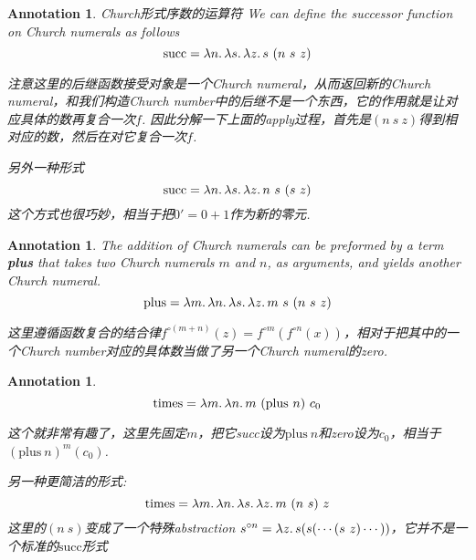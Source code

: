 \documentclass{article}
\theoremstyle{plain}
\newtheorem{annotation}[theorem]{Annotation}
\theoremstyle{nonumberplain}
\newcommand{\lam}[2]{\ensuremath{\lambda #1\ldotp #2}} %
\begin{document}
\begin{annotation}
\rm {\color{red}Church形式序数的运算符} We can define the successor function on Church numerals as follows
$$
\text{succ} = \lam{n}{\lam{s}{\lam{z}{s~(n~s~z)}}}
$$

{\color{blue} 注意这里的后继函数接受对象是一个Church numeral，从而返回新的Church numeral，和我们构造Church number中的后继不是一个东西，它的作用就是让对应具体的数再复合一次$f$. 因此分解一下上面的apply过程，首先是$(n~s~z)$得到相对应的数，然后在对它复合一次$f$}.

另外一种形式
$$
\text{succ} = \lam{n}{\lam{s}{\lam{z}{n~s~(s~z)}}}
$$
{\color{blue} 这个方式也很巧妙，相当于把$0' = 0 + 1$作为新的零元}.
\end{annotation}

\begin{annotation}
\rm The addition of Church numerals can be preformed by a term \textbf{plus} that takes two Church numerals $m$ and $n$, as arguments, and yields another Church numeral. 
$$
\text{plus} = \lam{m}{\lam{n}{\lam{s}{\lam{z}{m~s~(n~s~z)}}}}
$$

{\color{blue} 这里遵循函数复合的结合律$f^{\circ(m+n)}(z) = f^{\circ m}(f^{\circ n}(x))$，相对于把其中的一个Church number对应的具体数当做了另一个Church numeral的zero}.
\end{annotation} 

\begin{annotation} \rm
$$
\text{times} = \lam{m}{\lam{n}{m~(\text{plus}~n)~c_0}}
$$

{\color{blue} 这个就非常有趣了，这里先固定$m$，把它succ设为$\text{plus}~n$和zero设为$c_0$，相当于$(\text{plus}~n)^m(c_0)$}.

另一种更简洁的形式:
$$
\text{times} = \lam{m}{\lam{n}{\lam{s}{\lam{z}{m~(n~s)~z}}}}
$$
{\color{blue} 这里的$(n~s)$变成了一个特殊abstraction $s^{\circ n} = \lam{z}{s(s(\cdots(s~z)\cdots))}$，它并不是一个标准的$\text{succ}$形式}
\end{annotation}
\end{document}
